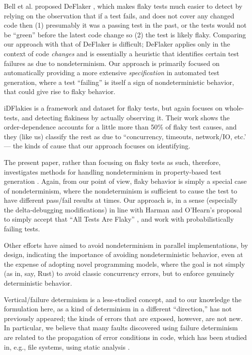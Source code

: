 Bell et al. proposed DeFlaker \cite{bell2018d}, which makes flaky tests much easier to detect by relying on the observation that if a test fails, and does not cover any changed code then (1) presumably it was a passing test in the past, or the tests would not be ``green'' before the latest code change so (2) the test is likely flaky.  Comparing our approach with that of DeFlaker is difficult; DeFlaker applies only in the context of code \emph{changes} and is essentially a heuristic that identifies certain test failures as due to nondeterminism.  Our approach is primarily focused on automatically providing a more extensive \emph{specification} in automated test generation, where a test ``failing'' is itself a sign of nondeterministic behavior, that could give rise to flaky behavior.

iDFlakies \cite{idflakies} is a framework and dataset for flaky tests, but again focuses on whole-tests, and detecting flakiness by actually observing it.  Their work shows the order-dependence accounts for a little more than 50\% of flaky test causes, and they (like us) classify the rest as due to ``concurrency, timeouts,
network/IO, etc.' --- the kinds of cause that our approach focuses on identifying.

The present paper, rather than focusing on flaky tests as such, therefore, investigates methods for handling nondeterminism in property-based test generation \cite{ClaessenH00,Papadakis:2011:PIT:2034654.2034663}.  Again, from our point of view, flaky behavior is simply a special case of nondeterminism, where the nondeterminism is sufficient to cause the test to have different pass/fail results at times.  Our approach is, in a sense (especially the delta-debugging modifications) in line with Harman and O'Hearn's proposal to simply accept that ``All Tests Are Flaky'' \cite{StartupstoScaleups}, and work with probabilistically failing tests.

Other efforts \cite{ParallelDeterministic} have aimed to avoid nondeterminism in parallel implementations, by design, indicating the importance of avoiding nondeterministic behavior, even at the expense of adopting novel programming models, where the goal is not simply (as in, say, Rust) to avoid classic concurrency errors, but to enforce genuinely deterministic behavior.

Vertical/failure determinism is a less-studied concept, and to our knowledge the formulation here, as a kind of determinism in a different ``direction,'' has not previously appeared; the kinds of errors that are exposed, however, are not new.  In particular, we believe that many faults discovered using failure determinism are related to the propagation of error conditions in code, which has been studied in, e.g., file systems, using static analysis \cite{FileProp}.

